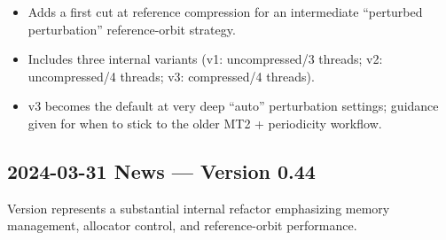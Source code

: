 \begin{itemize}
  
  \item Adds a first cut at reference compression for an intermediate “perturbed
  perturbation” reference-orbit strategy.

  \item Includes three internal variants (v1: uncompressed/3 threads; v2:
  uncompressed/4 threads; v3: compressed/4 threads).

  \item v3 becomes the default at very deep “auto” perturbation settings;
  guidance given for when to stick to the older MT2 + periodicity workflow.

\end{itemize}


\subsection{2024-03-31 News --- Version 0.44}

Version  represents a substantial internal refactor emphasizing memory management, allocator control, and reference-orbit performance.

